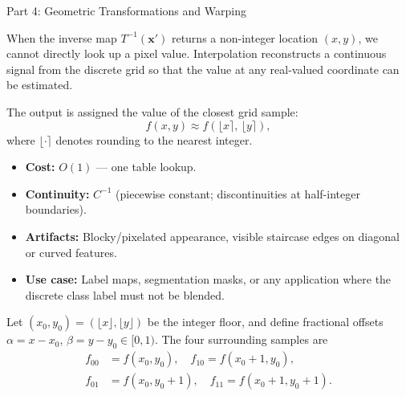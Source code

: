 \documentclass[letterpaper]{article}
\begin{document}
\begin{notes}{Part 4: Geometric Transformations and Warping}



When the inverse map $T^{-1}(\mathbf{x}')$ returns a non-integer location $(x,y)$, we cannot directly look up a pixel value. Interpolation reconstructs a continuous signal from the discrete grid so that the value at any real-valued coordinate can be estimated.


The output is assigned the value of the closest grid sample:
$$f(x,y) \approx f\!\left(\lfloor x\rceil,\, \lfloor y\rceil\right),$$
where $\lfloor\cdot\rceil$ denotes rounding to the nearest integer.
\begin{itemize}
    \item \textbf{Cost:} $O(1)$ — one table lookup.
    \item \textbf{Continuity:} $C^{-1}$ (piecewise constant; discontinuities at half-integer boundaries).
    \item \textbf{Artifacts:} Blocky/pixelated appearance, visible staircase edges on diagonal or curved features.
    \item \textbf{Use case:} Label maps, segmentation masks, or any application where the discrete class label must not be blended.
\end{itemize}


Let $(x_0, y_0) = (\lfloor x\rfloor, \lfloor y\rfloor)$ be the integer floor, and define fractional offsets $\alpha = x - x_0$, $\beta = y - y_0 \in [0,1)$. The four surrounding samples are
\begin{align*}
    f_{00}&=f(x_0,y_0),\quad f_{10}=f(x_0{+}1,y_0),\\
    f_{01}&=f(x_0,y_0{+}1),\quad f_{11}=f(x_0{+}1,y_0{+}1).
\end{align*}


\end{notes}
\end{document}
